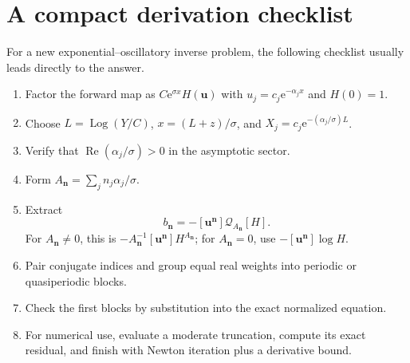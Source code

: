 \documentclass[11pt,oneside]{article}
\theoremstyle{plain}
\theoremstyle{definition}
\theoremstyle{remark}
\newcommand{\e}{\mathrm{e}}
\newcommand{\Real}{\operatorname{Re}}
\newcommand{\Log}{\operatorname{Log}}
\begin{document}
\section{A compact derivation checklist}
\label{app:checklist}

For a new exponential--oscillatory inverse problem, the following checklist
usually leads directly to the answer.
\begin{enumerate}
\item Factor the forward map as \(C\e^{\sigma x}H(\bm u)\) with
\(u_j=c_j\e^{-\alpha_jx}\) and \(H(0)=1\).
\item Choose \(L=\Log(Y/C)\), \(x=(L+z)/\sigma\), and
\(X_j=c_j\e^{-(\alpha_j/\sigma)L}\).
\item Verify that \(\Real(\alpha_j/\sigma)>0\) in the asymptotic sector.
\item Form \(A_{\bm n}=\sum_jn_j\alpha_j/\sigma\).
\item Extract
\[
 b_{\bm n}=-[\bm u^{\bm n}]\mathscr Q_{A_{\bm n}}[H].
\]
For \(A_{\bm n}\ne0\), this is
\(-A_{\bm n}^{-1}[\bm u^{\bm n}]H^{A_{\bm n}}\); for
\(A_{\bm n}=0\), use \(-[\bm u^{\bm n}]\log H\).
\item Pair conjugate indices and group equal real weights into periodic or
quasiperiodic blocks.
\item Check the first blocks by substitution into the exact normalized
equation.
\item For numerical use, evaluate a moderate truncation, compute its exact
residual, and finish with Newton iteration plus a derivative bound.
\end{enumerate}
\end{document}

